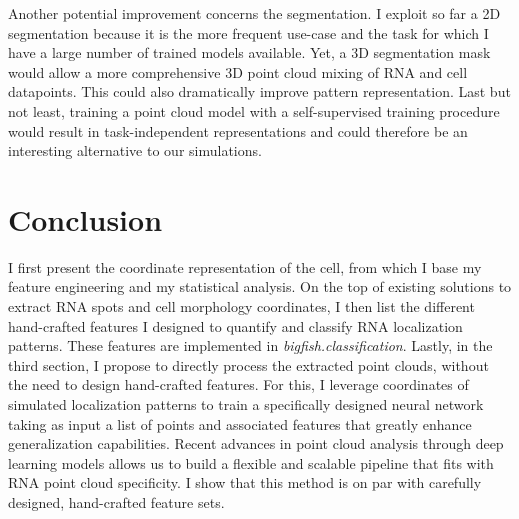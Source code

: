 Another potential improvement concerns the segmentation.
I exploit so far a 2D segmentation because it is the more frequent use-case and the task for which I have a large number of trained models available.
Yet, a 3D segmentation mask would allow a more comprehensive 3D point cloud mixing of \ac{RNA} and cell datapoints.
This could also dramatically improve pattern representation.
Last but not least, training a point cloud model with a self-supervised training procedure would result in task-independent representations and could therefore be an interesting alternative to our simulations. 

\section{Conclusion}
\label{sec:analysis_conclusion}

I first present the coordinate representation of the cell, from which I base my feature engineering and my statistical analysis.
On the top of existing solutions to extract \ac{RNA} spots and cell morphology coordinates, I then list the different hand-crafted features I designed to quantify and classify \ac{RNA} localization patterns.
These features are implemented in \emph{bigfish.classification}.
Lastly, in the third section, I propose to directly process the extracted point clouds, without the need to design hand-crafted features.
For this, I leverage coordinates of simulated localization patterns to train a specifically designed neural network taking as input a list of points and associated features that greatly enhance generalization capabilities.
Recent advances in point cloud analysis through deep learning models allows us to build a flexible and scalable pipeline that fits with \ac{RNA} point cloud specificity.
I show that this method is on par with carefully designed, hand-crafted feature sets.